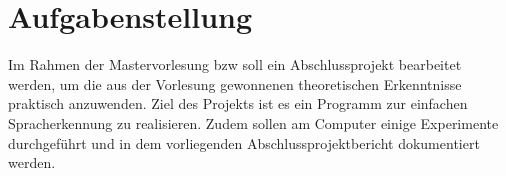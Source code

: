 \section{Aufgabenstellung}

Im Rahmen der Mastervorlesung  bzw  soll ein Abschlussprojekt bearbeitet werden, um die aus der Vorlesung gewonnenen theoretischen Erkenntnisse praktisch anzuwenden. 
Ziel des Projekts ist es ein Programm zur einfachen Spracherkennung zu realisieren. 
Zudem sollen am Computer einige Experimente durchgeführt und in dem vorliegenden Abschlussprojektbericht dokumentiert werden. 


